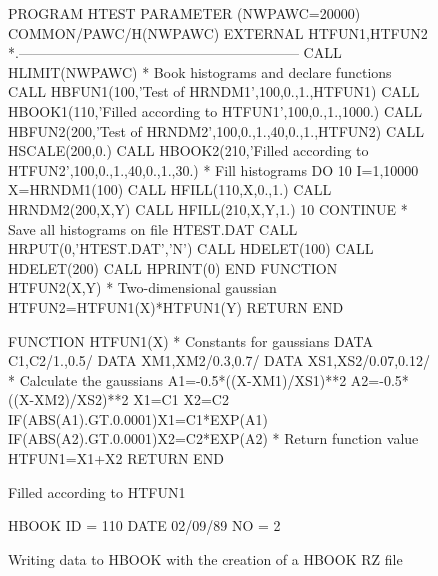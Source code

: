 \begin{figure}[p]
\begin{XMPfont}{8}
      PROGRAM HTEST
      PARAMETER (NWPAWC=20000)
      COMMON/PAWC/H(NWPAWC)
      EXTERNAL HTFUN1,HTFUN2
*.------------------------------------------------------------
      CALL HLIMIT(NWPAWC)
*             Book histograms and declare functions
      CALL HBFUN1(100,'Test of HRNDM1',100,0.,1.,HTFUN1)
      CALL HBOOK1(110,'Filled according to HTFUN1',100,0.,1.,1000.)
      CALL HBFUN2(200,'Test of HRNDM2',100,0.,1.,40,0.,1.,HTFUN2)
      CALL HSCALE(200,0.)
      CALL HBOOK2(210,'Filled according to HTFUN2',100,0.,1.,40,0.,1.,30.)
*             Fill histograms
      DO 10 I=1,10000
         X=HRNDM1(100)
         CALL HFILL(110,X,0.,1.)
         CALL HRNDM2(200,X,Y)
         CALL HFILL(210,X,Y,1.)
  10  CONTINUE
*             Save all histograms on file HTEST.DAT
      CALL HRPUT(0,'HTEST.DAT','N')
      CALL HDELET(100)
      CALL HDELET(200)
      CALL HPRINT(0)
      END
      FUNCTION HTFUN2(X,Y)
*             Two-dimensional gaussian
      HTFUN2=HTFUN1(X)*HTFUN1(Y)
      RETURN
      END
 
      FUNCTION HTFUN1(X)
*             Constants for gaussians
      DATA C1,C2/1.,0.5/
      DATA XM1,XM2/0.3,0.7/
      DATA XS1,XS2/0.07,0.12/
*             Calculate the gaussians
      A1=-0.5*((X-XM1)/XS1)**2
      A2=-0.5*((X-XM2)/XS2)**2
      X1=C1
      X2=C2
      IF(ABS(A1).GT.0.0001)X1=C1*EXP(A1)
      IF(ABS(A2).GT.0.0001)X2=C2*EXP(A2)
*             Return function value
      HTFUN1=X1+X2
      RETURN
      END
\end{XMPfont}

\caption{Writing data to HBOOK with the creation of a HBOOK RZ file}
\label{FEX1IN}

\begin{XMPfrac}{3.3}
Filled according to HTFUN1
 
HBOOK     ID =       110                                        DATE  02/09/89               NO =  2
 

\end{XMPfrac}
\end{figure}
